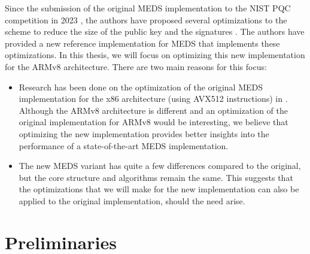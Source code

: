 \documentclass[11pt,a4paper]{report}
\theoremstyle{definition}
\begin{document}
Since the submission of the original MEDS implementation to the NIST PQC competition in 2023 \cite{chou2023meds}, the authors have proposed several optimizations to the scheme to reduce the size of the public key and the signatures \cite{chou2024reducing}. The authors have provided a new reference implementation for MEDS that implements these optimizations. In this thesis, we will focus on optimizing this new implementation for the ARMv8 architecture. There are two main reasons for this focus:
\begin{itemize}
  \item Research has been done on the optimization of the original MEDS implementation for the x86 architecture (using AVX512 instructions) in \cite{IIS2023LowLevel, IIS2023HighLevel}. Although the ARMv8 architecture is different and an optimization of the original implementation for ARMv8 would be interesting, we believe that optimizing the new implementation provides better insights into the performance of a state-of-the-art MEDS implementation.
  \item The new MEDS variant has quite a few differences compared to the original, but the core structure and algorithms remain the same. This suggests that the optimizations that we will make for the new implementation can also be applied to the original implementation, should the need arise.
\end{itemize}

\chapter{Preliminaries}
\label{ch:preliminaries}
\end{document}
